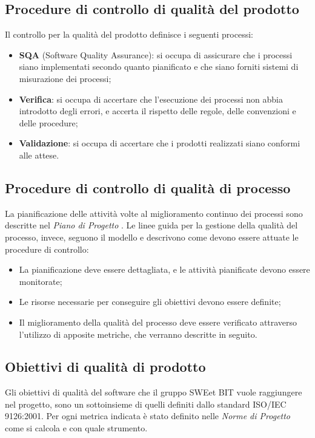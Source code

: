  \subsection{Procedure di controllo di qualità del prodotto}
    Il controllo per la qualità del prodotto definisce i seguenti processi:
    \begin{itemize}
      \item \textbf{SQA} (Software Quality Assurance): si occupa di assicurare
      che i processi siano implementati secondo quanto pianificato e che siano
      forniti sistemi di misurazione dei processi;
      \item \textbf{Verifica}: si occupa di accertare che l'esecuzione dei
      processi non abbia introdotto degli errori, e accerta il rispetto delle
      regole, delle convenzioni e delle procedure;
      \item \textbf{Validazione}: si occupa di accertare che i prodotti
      realizzati siano conformi alle attese.
    \end{itemize}

  \subsection{Procedure di controllo di qualità di processo}
  La pianificazione delle attività volte al miglioramento continuo dei processi
  sono descritte nel \emph{Piano di Progetto \VersionePP{}}. Le linee guida per
  la gestione della qualità del processo, invece, seguono il modello  e
  descrivono come devono essere attuate le procedure di controllo:
  \begin{itemize}
    \item La pianificazione deve essere dettagliata, e le attività pianificate
    devono essere monitorate;
    \item Le risorse necessarie per conseguire gli obiettivi devono essere
    definite;
    \item Il miglioramento della qualità del processo deve essere verificato
    attraverso l'utilizzo di apposite metriche, che verranno descritte in seguito.
  \end{itemize}
  
  
\subsection{Obiettivi di qualità di prodotto}  
Gli obiettivi di qualità del software che il gruppo SWEet BIT vuole raggiungere nel progetto, sono un sottoinsieme di quelli definiti dallo standard ISO/IEC 9126:2001.
Per ogni metrica indicata è stato definito nelle \emph{Norme di Progetto} \VersioneNP{} come si calcola e con quale strumento.

